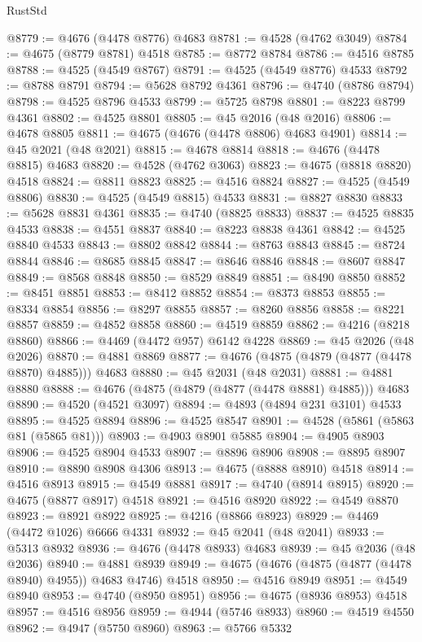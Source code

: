 \begin{lexlean}{RustStd}
\begin{coremodule}
{\begin{coremodule}
{{{{{{{{{{{{{{{{{{{{{{{{{{{{{{{{{{{{{{{{{{{{{{{{{{{{{{{{{{{{@8779 := @4676 (@4478 @8776) @4683
@8781 := @4528 (@4762 @3049)
@8784 := @4675 (@8779 @8781) @4518
@8785 := @8772 @8784
@8786 := @4516 @8785
@8788 := @4525 (@4549 @8767)
@8791 := @4525 (@4549 @8776) @4533
@8792 := @8788 @8791
@8794 := @5628 @8792 @4361
@8796 := @4740 (@8786 @8794)
@8798 := @4525 @8796 @4533
@8799 := @5725 @8798
@8801 := @8223 @8799 @4361
@8802 := @4525 @8801
@8805 := @45 @2016 (@48 @2016)
@8806 := @4678 @8805
@8811 := @4675 (@4676 (@4478 @8806) @4683 @4901)
@8814 := @45 @2021 (@48 @2021)
@8815 := @4678 @8814
@8818 := @4676 (@4478 @8815) @4683
@8820 := @4528 (@4762 @3063)
@8823 := @4675 (@8818 @8820) @4518
@8824 := @8811 @8823
@8825 := @4516 @8824
@8827 := @4525 (@4549 @8806)
@8830 := @4525 (@4549 @8815) @4533
@8831 := @8827 @8830
@8833 := @5628 @8831 @4361
@8835 := @4740 (@8825 @8833)
@8837 := @4525 @8835 @4533
@8838 := @4551 @8837
@8840 := @8223 @8838 @4361
@8842 := @4525 @8840 @4533
@8843 := @8802 @8842
@8844 := @8763 @8843
@8845 := @8724 @8844
@8846 := @8685 @8845
@8847 := @8646 @8846
@8848 := @8607 @8847
@8849 := @8568 @8848
@8850 := @8529 @8849
@8851 := @8490 @8850
@8852 := @8451 @8851
@8853 := @8412 @8852
@8854 := @8373 @8853
@8855 := @8334 @8854
@8856 := @8297 @8855
@8857 := @8260 @8856
@8858 := @8221 @8857
@8859 := @4852 @8858
@8860 := @4519 @8859
@8862 := @4216 (@8218 @8860)
@8866 := @4469 (@4472 @957) @6142 @4228
@8869 := @45 @2026 (@48 @2026)
@8870 := @4881 @8869
@8877 := @4676 (@4875 (@4879 (@4877 (@4478 @8870) @4885))) @4683
@8880 := @45 @2031 (@48 @2031)
@8881 := @4881 @8880
@8888 := @4676 (@4875 (@4879 (@4877 (@4478 @8881) @4885))) @4683
@8890 := @4520 (@4521 @3097)
@8894 := @4893 (@4894 @231 @3101) @4533
@8895 := @4525 @8894
@8896 := @4525 @8547
@8901 := @4528 (@5861 (@5863 @81 (@5865 @81)))
@8903 := @4903 @8901 @5885
@8904 := @4905 @8903
@8906 := @4525 @8904 @4533
@8907 := @8896 @8906
@8908 := @8895 @8907
@8910 := @8890 @8908 @4306
@8913 := @4675 (@8888 @8910) @4518
@8914 := @4516 @8913
@8915 := @4549 @8881
@8917 := @4740 (@8914 @8915)
@8920 := @4675 (@8877 @8917) @4518
@8921 := @4516 @8920
@8922 := @4549 @8870
@8923 := @8921 @8922
@8925 := @4216 (@8866 @8923)
@8929 := @4469 (@4472 @1026) @6666 @4331
@8932 := @45 @2041 (@48 @2041)
@8933 := @5313 @8932
@8936 := @4676 (@4478 @8933) @4683
@8939 := @45 @2036 (@48 @2036)
@8940 := @4881 @8939
@8949 := @4675 (@4676 (@4875 (@4877 (@4478 @8940) @4955)) @4683 @4746) @4518
@8950 := @4516 @8949
@8951 := @4549 @8940
@8953 := @4740 (@8950 @8951)
@8956 := @4675 (@8936 @8953) @4518
@8957 := @4516 @8956
@8959 := @4944 (@5746 @8933)
@8960 := @4519 @4550
@8962 := @4947 (@5750 @8960)
@8963 := @5766 @5332
}}}}}}}}}}}}}}}}}}}}}}}}}}}}}}}}}}}}}}}}}}}}}}}}}}}}}}}}}}}}
\end{coremodule}}
\end{coremodule}
\end{lexlean}

